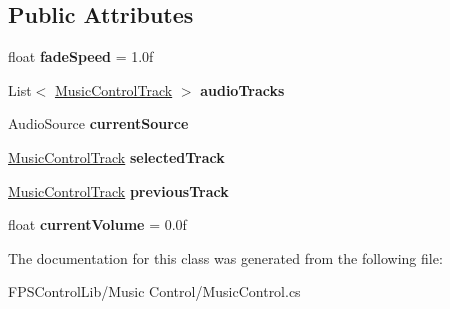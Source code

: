 \subsection*{Public Attributes}
\begin{DoxyCompactItemize}
\item 
\hypertarget{class_f_p_s_control_1_1_music_control_a78046b7c2e53fb216c6487304e512920}{float {\bfseries fade\-Speed} = 1.\-0f}\label{class_f_p_s_control_1_1_music_control_a78046b7c2e53fb216c6487304e512920}

\item 
\hypertarget{class_f_p_s_control_1_1_music_control_a85511841f81609be82fe6e4634276430}{List$<$ \hyperlink{class_f_p_s_control_1_1_music_control_track}{Music\-Control\-Track} $>$ {\bfseries audio\-Tracks}}\label{class_f_p_s_control_1_1_music_control_a85511841f81609be82fe6e4634276430}

\item 
\hypertarget{class_f_p_s_control_1_1_music_control_acab5bfacb283f1d009eb14510c2a4d12}{Audio\-Source {\bfseries current\-Source}}\label{class_f_p_s_control_1_1_music_control_acab5bfacb283f1d009eb14510c2a4d12}

\item 
\hypertarget{class_f_p_s_control_1_1_music_control_a7a6651845d37d877fe09e990b538d640}{\hyperlink{class_f_p_s_control_1_1_music_control_track}{Music\-Control\-Track} {\bfseries selected\-Track}}\label{class_f_p_s_control_1_1_music_control_a7a6651845d37d877fe09e990b538d640}

\item 
\hypertarget{class_f_p_s_control_1_1_music_control_a5d33b19b7066ef5a102f0adcdad77536}{\hyperlink{class_f_p_s_control_1_1_music_control_track}{Music\-Control\-Track} {\bfseries previous\-Track}}\label{class_f_p_s_control_1_1_music_control_a5d33b19b7066ef5a102f0adcdad77536}

\item 
\hypertarget{class_f_p_s_control_1_1_music_control_a584d43fcb0d119b5f4da755b5d7f7f74}{float {\bfseries current\-Volume} = 0.\-0f}\label{class_f_p_s_control_1_1_music_control_a584d43fcb0d119b5f4da755b5d7f7f74}

\end{DoxyCompactItemize}


The documentation for this class was generated from the following file\-:\begin{DoxyCompactItemize}
\item 
F\-P\-S\-Control\-Lib/\-Music Control/Music\-Control.\-cs\end{DoxyCompactItemize}
